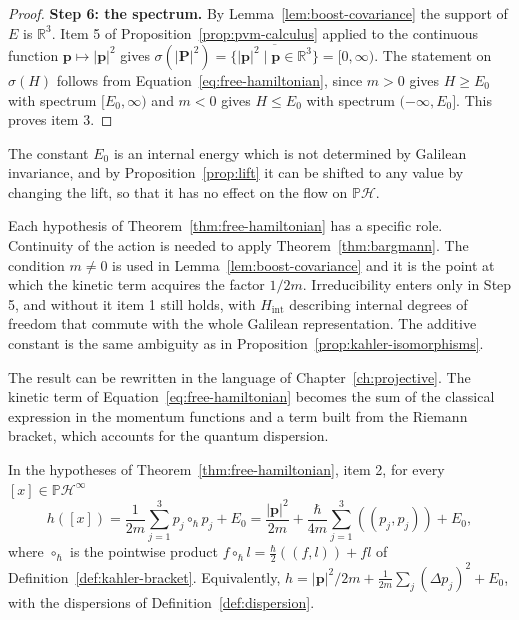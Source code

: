 \begin{proof}
	\medskip
	\noindent\textbf{Step 6: the spectrum.} By Lemma~\ref{lem:boost-covariance} the support of $E$ is $\mathbb{R}^3$. Item 5 of Proposition~\ref{prop:pvm-calculus} applied to the continuous function $\mathbf{p}\mapsto|\mathbf{p}|^2$ gives $\sigma(|\mathbf{P}|^2)=\overline{\{|\mathbf{p}|^2\mid\mathbf{p}\in\mathbb{R}^3\}}=[0,\infty)$. The statement on $\sigma(H)$ follows from Equation~\eqref{eq:free-hamiltonian}, since $m>0$ gives $H\ge E_0$ with spectrum $[E_0,\infty)$ and $m<0$ gives $H\le E_0$ with spectrum $(-\infty,E_0]$. This proves item 3.
\end{proof}

\noindent The constant $E_0$ is an internal energy which is not determined by Galilean invariance, and by Proposition~\ref{prop:lift} it can be shifted to any value by changing the lift, so that it has no effect on the flow on $\mathbb{P}\mathcal{H}$.

\begin{remark}
	Each hypothesis of Theorem~\ref{thm:free-hamiltonian} has a specific role. Continuity of the action is needed to apply Theorem~\ref{thm:bargmann}. The condition $m\neq0$ is used in Lemma~\ref{lem:boost-covariance} and it is the point at which the kinetic term acquires the factor $1/2m$. Irreducibility enters only in Step 5, and without it item 1 still holds, with $H_{\mathrm{int}}$ describing internal degrees of freedom that commute with the whole Galilean representation. The additive constant is the same ambiguity as in Proposition~\ref{prop:kahler-isomorphisms}.
\end{remark}

The result can be rewritten in the language of Chapter~\ref{ch:projective}. The kinetic term of Equation~\eqref{eq:free-hamiltonian} becomes the sum of the classical expression in the momentum functions and a term built from the Riemann bracket, which accounts for the quantum dispersion.

\begin{corollary}\label{cor:geometric-hamiltonian}
	In the hypotheses of Theorem~\ref{thm:free-hamiltonian}, item 2, for every $[x]\in\mathbb{P}\mathcal{H}^\infty$
	\begin{equation}
		h([x])=\frac{1}{2m}\sum_{j=1}^3 p_j\circ_{\hbar} p_j+E_0=\frac{|\mathbf{p}|^2}{2m}+\frac{\hbar}{4m}\sum_{j=1}^3((p_j,p_j))+E_0,
		\label{eq:geometric-hamiltonian}
	\end{equation}
	where $\circ_{\hbar}$ is the pointwise product $f\circ_{\hbar} l=\tfrac{\hbar}{2}((f,l))+fl$ of Definition~\ref{def:kahler-bracket}. Equivalently, $h=|\mathbf{p}|^2/2m+\tfrac{1}{2m}\sum_j(\Delta p_j)^2+E_0$, with the dispersions of Definition~\ref{def:dispersion}.
\end{corollary}

